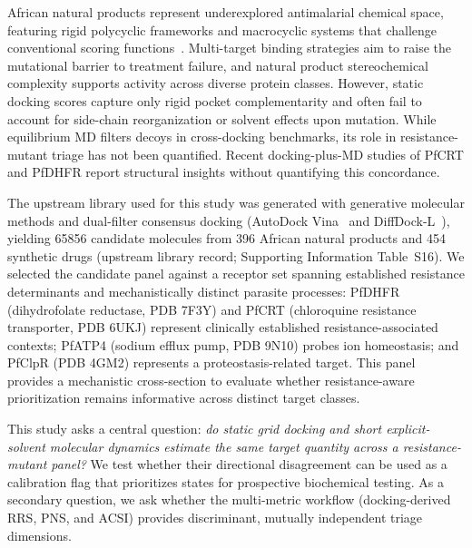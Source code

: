 \documentclass[journal=jcisd8,manuscript=article,layout=traditional]{achemso}
\begin{document}
African natural products represent underexplored antimalarial chemical space, featuring rigid polycyclic frameworks and macrocyclic systems that challenge conventional scoring functions~\citep{ferreira2023docking}. Multi-target binding strategies aim to raise the mutational barrier to treatment failure\citep{polypharmacology_malaria_2026}, and natural product stereochemical complexity supports activity across diverse protein classes\citep{polypharmacology_malaria_2026,value_addition_african_np_2025}. However, static docking scores capture only rigid pocket complementarity and often fail to account for side-chain reorganization or solvent effects upon mutation\citep{ferreira2023docking,soares2023mdreport}. While equilibrium MD filters decoys in cross-docking benchmarks\citep{liu2017mdfilter}, its role in resistance-mutant triage has not been quantified. Recent docking-plus-MD studies of PfCRT and PfDHFR report structural insights without quantifying this concordance\citep{ghosh2025pfcrt,gogoi2026np}.

The upstream library used for this study was generated with generative molecular methods and dual-filter consensus docking (AutoDock Vina~\citep{vina_2021} and DiffDock-L~\citep{diffdock_2023}), yielding \num{65856} candidate molecules from 396 African natural products and 454 synthetic drugs (upstream library record; Supporting Information Table~S16). We selected the candidate panel against a receptor set spanning established resistance determinants and mechanistically distinct parasite processes: PfDHFR (dihydrofolate reductase, PDB 7F3Y) and PfCRT (chloroquine resistance transporter, PDB 6UKJ) represent clinically established resistance-associated contexts; PfATP4 (sodium efflux pump, PDB 9N10) probes ion homeostasis; and PfClpR (PDB 4GM2) represents a proteostasis-related target. This panel provides a mechanistic cross-section to evaluate whether resistance-aware prioritization remains informative across distinct target classes.

This study asks a central question: \textit{do static grid docking and short explicit-solvent molecular dynamics estimate the same target quantity across a resistance-mutant panel?} We test whether their directional disagreement can be used as a calibration flag that prioritizes states for prospective biochemical testing. As a secondary question, we ask whether the multi-metric workflow (docking-derived RRS, PNS, and ACSI) provides discriminant, mutually independent triage dimensions.
\end{document}

